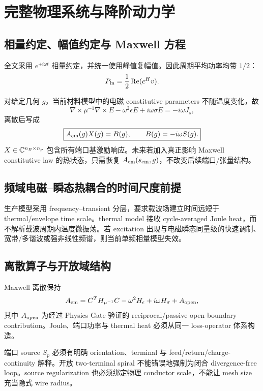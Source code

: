 \section{完整物理系统与降阶动力学}

\subsection{相量约定、幅值约定与 Maxwell 方程}
全文采用 $e^{+i\omega t}$ 相量约定，并统一使用峰值复幅值。因此周期平均功率均带 $1/2$：
\begin{equation}
P_{\rm in}=\frac12\operatorname{Re}(c^H v).
\end{equation}

对给定几何 $g$，当前材料模型中的电磁 constitutive parameters 不随温度变化，故
\begin{equation}
\nabla\times\mu^{-1}\nabla\times E-\omega^2\epsilon E+i\omega\sigma E=-i\omega J_s,
\end{equation}
离散后写成
\begin{equation}
\boxed{A_{\rm em}(g)X(g)=B(g),\qquad B(g)=-i\omega S(g).}
\end{equation}
$X\in\mathbb{C}^{n_E\times n_p}$ 包含所有端口基激励响应。未来若加入真正影响 Maxwell constitutive law 的热状态，只需恢复 $A_{\rm em}(s_{\rm em},g)$，不改变后续端口/张量结构。

\subsection{频域电磁--瞬态热耦合的时间尺度前提}
生产模型采用 frequency--transient 分层，要求载波场建立时间远短于 thermal/envelope time scale。thermal model 接收 cycle-averaged Joule heat，而不解析载波周期内温度微振荡。若 excitation 出现与电磁瞬态同量级的快速调制、宽带/多谐波或强非线性频谱，则当前单频相量模型失效。

\subsection{离散算子与开放域结构}
Maxwell 离散保持
\begin{equation}
A_{\rm em}=C^TH_{\mu^{-1}}C-\omega^2H_\epsilon+i\omega H_\sigma+A_{\rm open},
\end{equation}
其中 $A_{\rm open}$ 为经过 Physics Gate 验证的 reciprocal/passive open-boundary contribution。Joule、端口功率与 thermal heat 必须从同一 loss-operator 体系构造。

端口 source $S_p$ 必须有明确 orientation、terminal 与 feed/return/charge-continuity 解释。开放 two-terminal spiral 不能错误地强制为闭合 divergence-free loop。source regularization 也必须绑定物理 conductor scale，不能让 mesh size 充当隐式 wire radius。

